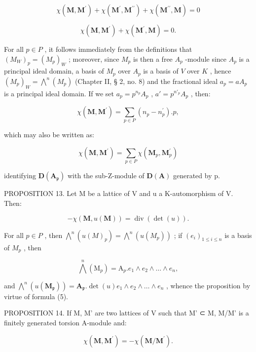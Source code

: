 \[
\chi (\mathbf {M}, \mathbf {M} ^ {\prime}) + \chi (\mathbf {M} ^ {\prime}, \mathbf {M} ^ {\prime \prime}) + \chi (\mathbf {M} ^ {\prime \prime}, \mathbf {M}) = 0\tag{3}
\]

\[
\chi (\mathbf {M}, \mathbf {M} ^ {\prime}) + \chi (\mathbf {M} ^ {\prime}, \mathbf {M}) = 0\tag{4}.
\]

For all \(p \in P\) , it follows immediately from the definitions that \((M_{W})_p = (M_p)_{W}\) ; moreover, since \(M_p\) is then a free \(A_p\) -module since \(A_p\) is a principal ideal domain, a basis of \(M_p\) over \(A_p\) is a basis of \(V\) over \(K\) , hence \((M_p)_W = \bigwedge^n (M_p)\) (Chapter II, § 2, no. 8) and the fractional ideal \(a_p = aA_p\) is a principal ideal domain. If we set \(a_p = p^{n_p} A_p\) , \(a' = p^{n'_{p}} A_p\) , then:

\[
\chi (\mathbf {M}, \mathbf {M} ^ {\prime}) = \sum_ {p \in P} (n _ {p} - n _ {p} ^ {\prime}). p,
\]

which may also be written as:

\[
\chi (\mathbf {M}, \mathbf {M} ^ {\prime}) = \sum_ {p \in P} \chi (\mathbf {M} _ {p}, \mathbf {M} _ {p} ^ {\prime})\tag{5}
\]

identifying \(\mathbf{D}(\mathbf{A}_{\mathfrak{p}})\) with the sub-Z-module of \(\mathbf{D}(\mathbf{A})\) generated by p.

PROPOSITION 13. Let M be a lattice of V and u a K-automorphism of V. Then:

\[
- \chi (\mathbf {M}, u (\mathbf {M})) = \operatorname{div} (\det (u)).\tag{6}
\]

For all \(p \in P\) , then \(\bigwedge^{n} (u(M)_{p}) = \bigwedge^{n} (u(M_{p}))\) ; if \((e_{i})_{1 \leqslant i \leqslant n}\) is a basis of \(M_{p}\) , then

\[
\bigwedge^ {n} \left(\mathrm{M} _ {p}\right) = \mathrm{A} _ {p}. e _ {1} \wedge e _ {2} \wedge \dots \wedge e _ {n},
\]

and \(\bigwedge^{n}(u(\mathbf{M}_{\mathfrak{p}})) = \mathbf{A}_{\mathfrak{p}}.\det (u)e_{1}\wedge e_{2}\wedge \dots \wedge e_{n}\) , whence the proposition by virtue of formula (5).

PROPOSITION 14. If M, M' are two lattices of V such that M' ⊂ M, M/M' is a finitely generated torsion A-module and:

\[
\chi (\mathbf {M}, \mathbf {M} ^ {\prime}) = - \chi (\mathbf {M} / \mathbf {M} ^ {\prime}).\tag{7}
\]

